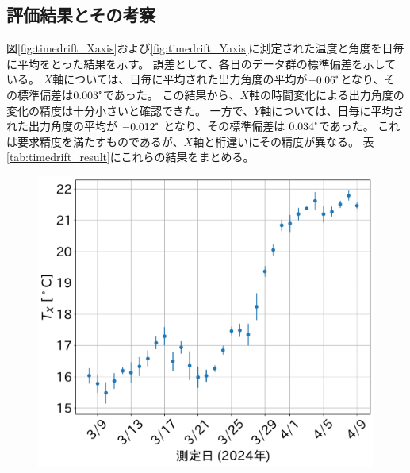 \documentclass[../../main.tex]{subfiles}
\begin{document}
\subsection{評価結果とその考察}
図\ref{fig:timedrift_Xaxis}および\ref{fig:timedrift_Yaxis}に測定された温度と角度を日毎に平均をとった結果を示す。
誤差として、各日のデータ群の標準偏差を示している。
$X$軸については、日毎に平均された出力角度の平均が$-0.06\tcdegree$となり、その標準偏差は$0.003\tcdegree$であった。
この結果から、$X$軸の時間変化による出力角度の変化の精度は十分小さいと確認できた。
一方で、$Y$軸については、日毎に平均された出力角度の平均が $-0.012\tcdegree$ となり、その標準偏差は $0.034\tcdegree$であった。
これは要求精度を満たすものであるが、$X$軸と桁違いにその精度が異なる。
表\ref{tab:timedrift_result}にこれらの結果をまとめる。
\begin{figure}[H]
    \begin{minipage}[b]{0.45\columnwidth}
        \centering
        \includegraphics[width=1.0\columnwidth]{tiltsensor/timedrift_tempX_daily.pdf}
        \subcaption{}
        \label{fig:timedrift_tempX}
    \end{minipage}
    \hspace{2mm}
    \begin{minipage}[b]{0.527\columnwidth}
        \centering

\end{minipage}
\end{figure}
\end{document}
